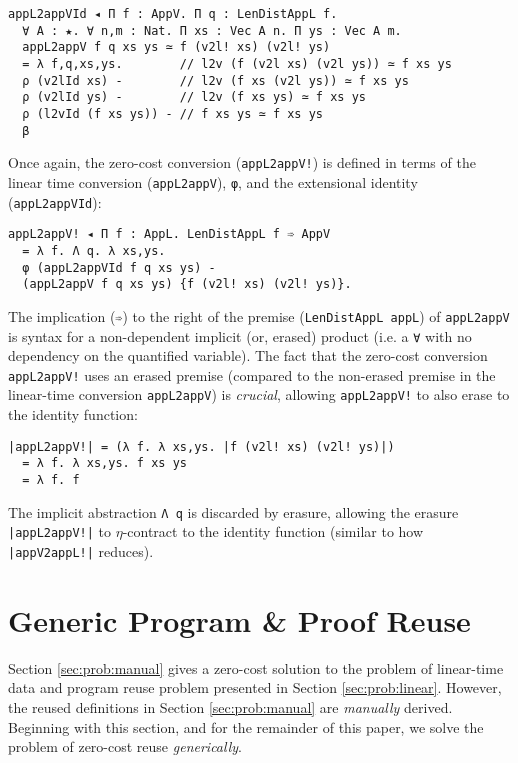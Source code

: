 \documentclass[acmsmall]{acmart}\settopmatter{}
\newcommand{\refsec}[1]{Section \ref{sec:#1}}
\newcommand{\labsec}[1]{\label{sec:#1}}
\begin{document}
\begin{verbatim}
appL2appVId ◂ Π f : AppV. Π q : LenDistAppL f.
  ∀ A : ★. ∀ n,m : Nat. Π xs : Vec A n. Π ys : Vec A m.
  appL2appV f q xs ys ≃ f (v2l! xs) (v2l! ys)
  = λ f,q,xs,ys.        // l2v (f (v2l xs) (v2l ys)) ≃ f xs ys
  ρ (v2lId xs) -        // l2v (f xs (v2l ys)) ≃ f xs ys
  ρ (v2lId ys) -        // l2v (f xs ys) ≃ f xs ys
  ρ (l2vId (f xs ys)) - // f xs ys ≃ f xs ys
  β
\end{verbatim}
Once again, the zero-cost conversion (\verb;appL2appV!;) is defined in
terms of the linear time conversion (\verb;appL2appV;),
\verb;φ;, and the extensional identity (\verb;appL2appVId;):

\begin{verbatim}
appL2appV! ◂ Π f : AppL. LenDistAppL f ➾ AppV
  = λ f. Λ q. λ xs,ys. 
  φ (appL2appVId f q xs ys) - 
  (appL2appV f q xs ys) {f (v2l! xs) (v2l! ys)}.
\end{verbatim}
The implication (\verb;➾;) to the right of the
premise (\verb;LenDistAppL appL;) of \verb;appL2appV; is syntax for a
non-dependent implicit (or, erased) product (i.e. a \verb;∀; with no
dependency on the quantified variable).
The fact that the zero-cost conversion \verb;appL2appV!; uses an
erased premise (compared to the non-erased premise in the linear-time
conversion \verb;appL2appV;) is \textit{crucial},
allowing \verb;appL2appV!; to also erase to the identity function:

\begin{verbatim}
|appL2appV!| = (λ f. λ xs,ys. |f (v2l! xs) (v2l! ys)|) 
  = λ f. λ xs,ys. f xs ys 
  = λ f. f
\end{verbatim}
The implicit abstraction \verb;Λ q; is discarded by erasure,
allowing the erasure \verb;|appL2appV!|; to $\eta$-contract to the
identity function (similar to how \verb;|appV2appL!|; reduces).

\section{Generic Program \& Proof Reuse}
\labsec{prog}

\refsec{prob:manual} gives a zero-cost solution to the problem of
linear-time data and program reuse problem presented in
\refsec{prob:linear}. However, the reused definitions in
\refsec{prob:manual} are \textit{manually} derived. Beginning with
this section, and for the remainder of this paper, we solve the
problem of zero-cost reuse \textit{generically}.
\end{document}
